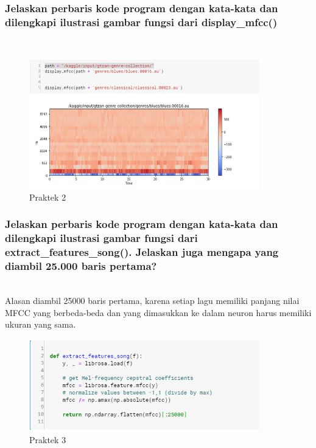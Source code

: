 	\subsubsection{Jelaskan perbaris kode program dengan kata-kata dan dilengkapi ilustrasi gambar fungsi dari display\_mfcc()}
\hfill\\

	
	
	\begin{figure}[H]
		\begin{center}
		 \includegraphics[width=10cm]{figures/1174076/figures6/praktek2.png}
		 \caption{Praktek 2}	
		\end{center}
	\end{figure}
 
 
\subsubsection{Jelaskan perbaris kode program dengan kata-kata dan dilengkapi ilustrasi gambar fungsi dari extract\_features\_song(). Jelaskan juga mengapa yang diambil 25.000 baris pertama?}
\hfill\\
Alasan diambil 25000 baris pertama, karena setiap lagu memiliki panjang nilai MFCC yang berbeda-beda dan yang dimasukkan ke dalam neuron harus memiliki ukuran yang sama.

	
	
	\begin{figure}[H]
		\begin{center}
		 \includegraphics[width=10cm]{figures/1174076/figures6/praktek3.png}
		 \caption{Praktek 3}	
		\end{center}
	\end{figure}
 
